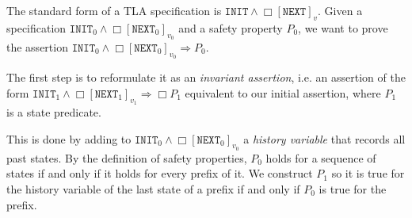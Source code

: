 \documentclass{easychair}
\newcommand{\init}{\texttt{INIT}}
\newcommand{\next}{\texttt{NEXT}}
\def\ddnote{\ednote{DD}}
\newtheorem{lemma}[theorem]{Lemma}
\newtheorem{definition}[theorem]{Definition}
\newenvironment{proofsketch}{\par\noindent\textbf{Proof (sketch).}\quad}{\medskip}
\begin{document}
%
%

The standard form of a TLA specification is
$\init\wedge\Box[\next]_v$. Given a specification
$\init_0\wedge\Box[\next_0]_{v_0}$ and a safety property $P_0$, we want
to prove the assertion $\init_0\wedge\Box[\next_0]_{v_0}\Rightarrow P_0$.

The first step is to reformulate it as an {\em invariant
assertion}, i.e. an assertion of the form
$\init_1\wedge\Box[\next_1]_{v_1}\Rightarrow\Box P_1$ equivalent to our
initial assertion, where $P_1$ is a state predicate.

This is done by adding to $\init_0\wedge\Box[\next_0]_{v_0}$ a {\em
history variable} that records all past states.
By the definition of safety properties,
$P_0$ holds for a sequence of states if and only if it holds for
every prefix of it. We construct $P_1$ so it is true
for the history variable of the last state of a prefix if and only if
$P_0$ is true for the prefix.
\end{document}
